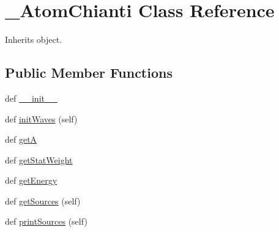 \hypertarget{classpyneb_1_1utils_1_1pn__chianti_1_1___atom_chianti}{}\section{\+\_\+\+Atom\+Chianti Class Reference}
\label{classpyneb_1_1utils_1_1pn__chianti_1_1___atom_chianti}


Inherits object.

\subsection*{Public Member Functions}
\begin{DoxyCompactItemize}
\item 
def \hyperlink{classpyneb_1_1utils_1_1pn__chianti_1_1___atom_chianti_ac775ee34451fdfa742b318538164070e}{\+\_\+\+\_\+init\+\_\+\+\_\+}
\item 
def \hyperlink{classpyneb_1_1utils_1_1pn__chianti_1_1___atom_chianti_aecb5df9a52e3983689ccddc2c20cc6f0}{init\+Waves} (self)
\item 
def \hyperlink{classpyneb_1_1utils_1_1pn__chianti_1_1___atom_chianti_a17192519660871ef6a77e6bdad6f580d}{get\+A}
\item 
def \hyperlink{classpyneb_1_1utils_1_1pn__chianti_1_1___atom_chianti_a00fb8d8bc6381e46ebb1b76b2770442a}{get\+Stat\+Weight}
\item 
def \hyperlink{classpyneb_1_1utils_1_1pn__chianti_1_1___atom_chianti_a8406acc27904d955ee4dbb458f60db52}{get\+Energy}
\item 
def \hyperlink{classpyneb_1_1utils_1_1pn__chianti_1_1___atom_chianti_ada746cff051b4eefa5f61aa4ad0e7fa6}{get\+Sources} (self)
\item 
def \hyperlink{classpyneb_1_1utils_1_1pn__chianti_1_1___atom_chianti_a8391e786a420d63ed15d4efd3f04aad5}{print\+Sources} (self)
\end{DoxyCompactItemize}
